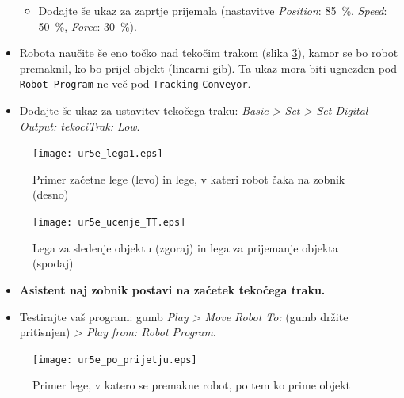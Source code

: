 \begin{mdframed}[backgroundcolor=yellow!20, shadow=true,roundcorner=8pt]
\begin{itemize}
\begin{itemize}
      \item Dodajte še ukaz za zaprtje prijemala (nastavitve \emph{Position}: 85~\%, \emph{Speed}: 50~\%, \emph{Force}: 30~\%).
  \end{itemize}
  \item Robota naučite še eno točko nad tekočim trakom (slika \ref{fig:ur_after}), kamor se bo robot premaknil, ko bo prijel objekt (linearni gib). Ta ukaz mora biti ugnezden pod \verb"Robot Program" ne več pod \verb"Tracking" \verb"Conveyor".
  \item Dodajte še ukaz za ustavitev tekočega traku: \emph{Basic > Set > Set Digital Output: tekociTrak: Low}.
 \end{itemize}
\end{mdframed}

   \begin{figure}[!htb]
\centering
 \texttt{[image: ur5e\_lega1.eps]}
\caption{Primer začetne lege (levo) in lege, v kateri robot čaka na zobnik (desno)}
\label{fig:ur_lega1}
\end{figure}

   \begin{figure}[!htb]
\centering
 \texttt{[image: ur5e\_ucenje\_TT.eps]}
\caption{Lega za sledenje objektu (zgoraj) in lega za prijemanje objekta (spodaj)}
\label{fig:ur_ucenje_TT}
\end{figure}

  \begin{mdframed}[backgroundcolor=red!20, shadow=true,roundcorner=8pt]
\begin{itemize}
  \item \textbf{Asistent naj zobnik postavi na začetek tekočega traku.}
\end{itemize}

\end{mdframed}
  \begin{mdframed}[backgroundcolor=yellow!20, shadow=true,roundcorner=8pt]
\begin{itemize}
  \item Testirajte vaš program: gumb \emph{Play > Move Robot To:} (gumb držite pritisnjen) \emph{> Play from: Robot Program}.
\end{itemize}
\end{mdframed}



  \begin{figure}[!hbt]
\centering
 \texttt{[image: ur5e\_po\_prijetju.eps]}
\caption{Primer lege, v katero se premakne robot, po tem ko prime objekt}
\label{fig:ur_after}
\end{figure}


